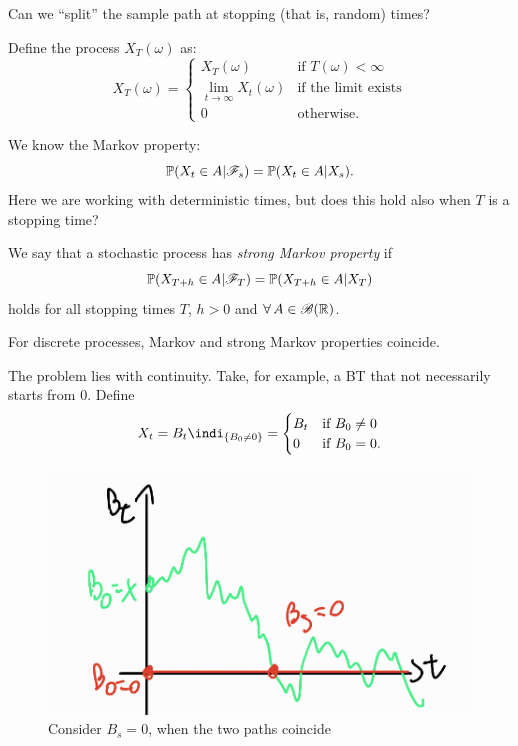 \documentclass[12pt]{report}
\begin{document}
Can we ``split'' the sample path at stopping (that is, random) times?
\begin{definition}
	Define the process $X_{T}(\omega)$ as:
	\begin{equation*}
		X_{T}(\omega)=\begin{cases}
			X_{T}(\omega)&\text{if }T(\omega)<\infty\\
			\lim_{t\to\infty}X_{t}(\omega)&\text{if the limit exists}\\0&\text{otherwise.} 
		\end{cases}
	\end{equation*}
\end{definition}
We know the Markov property:
\begin{equation*}
	\mathbb{P}(X_{t}\in A|\mathscr{F}_{s})=\mathbb{P}(X_{t}\in A|X_{s}).
\end{equation*}
Here we are working with deterministic times, but does this hold also when $T$ is a stopping time?
\begin{definition}
	We say that a stochastic process has \emph{strong Markov property} if
	\begin{equation*}
		\mathbb{P}(X_{T+h}\in A|\mathscr{F}_{T})=\mathbb{P}(X_{T+h}\in A|X_{T})
	\end{equation*}
	holds for all stopping times $T$, $h>0$ and $\forall\, A\in\mathscr{B}(\mathbb{R})$.
\end{definition}
\begin{remark}
	For discrete processes, Markov and strong Markov properties coincide.
\end{remark}
The problem lies with continuity. Take, for example, a \bwm{} BT that not necessarily starts from 0. Define
\begin{equation*}
	X_{t}=B_{t}\indi_{\{B_{0}\neq0\}}=\begin{cases}
		B_{t}&\text{if }B_{0}\neq0\\0&\text{if }B_{0}=0.
	\end{cases}
\end{equation*}
\begin{figure}[h]
	\centering
	\includegraphics[width=0.5\linewidth]{img/screenshot020}
	\caption{Consider $B_s=0$, when the two paths coincide}
	\label{fig:screenshot020}
\end{figure}
\end{document}

